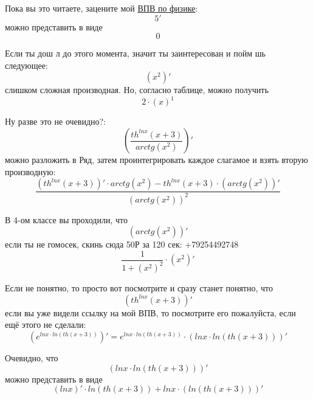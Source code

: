 \documentclass[a4paper, 12pt]{article}
\begin{document}
Пока вы это читаете, зацените мой \href{https://drive.google.com/drive/folders/1cQOob8lLqhboZnilkguOm7CtLHlbPb1G?usp=sharing}{ВПВ по физике}:
\begin{equation}
5 '\end{equation}
можно представить в виде
\[0\]

Если ты дош л до этого момента, значит ты заинтересован и пойм шь следующее:
\begin{equation}
\left(x^{2} \right)'
\end{equation}
слишком сложная производная. Но, согласно таблице, можно получить
\begin{equation}
2\cdot \left(x \right)^1
\end{equation}

Ну разве это не очевидно?:
\begin{equation}
\left(\frac{th^{lnx}\left(x + 3\right)}{arctg\left(x^{2}\right)} \right)'
\end{equation}
можно разложить в Ряд, затем проинтегрировать каждое слагамое и взять вторую производную:
\begin{equation}
\frac{\left(th^{lnx}\left(x + 3\right) \right)' \cdot arctg\left(x^{2}\right) - th^{lnx}\left(x + 3\right)\cdot \left(arctg\left(x^{2}\right) \right)'}{\left(arctg\left(x^{2}\right) \right)^2}
\end{equation}

В 4-ом классе вы проходили, что
\begin{equation}
\left(arctg\left(x^{2}\right) \right)'
\end{equation}
если ты не гомосек, скинь сюда 50Р за 120 сек: +79254492748
\begin{equation}
\frac{1}{1+\left( x^{2} \right)^2} \cdot \left( x^{2} \right)'
\end{equation}

Если не понятно, то просто вот посмотрите и сразу станет понятно, что
\begin{equation}
\left(th^{lnx}\left(x + 3\right) \right)'
\end{equation}
если вы уже видели ссылку на мой ВПВ, то посмотрите его пожалуйста, если ещё этого не сделали:
\begin{equation}
\left(e^{lnx\cdot ln \left(th\left(x + 3\right) \right)}  \right)' = e^{lnx\cdot ln \left(th\left(x + 3\right) \right)} \cdot \left( lnx\cdot ln \left(th\left(x + 3\right) \right) \right)'
\end{equation}

Очевидно, что
\begin{equation}
\left(lnx \cdot ln\left(th\left(x + 3\right)\right) \right)'
\end{equation}
можно представить в виде
\begin{equation}
\left(lnx \right)' \cdot ln\left(th\left(x + 3\right)\right) + lnx\cdot \left( ln\left(th\left(x + 3\right)\right) \right)'
\end{equation}
\end{document}

